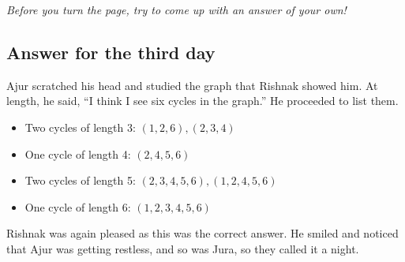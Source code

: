 \textit{Before you turn the page, try to come up with an answer of your own!}

\newpage
\subsection*{Answer for the third day}
Ajur scratched his head and studied the graph that Rishnak showed him.  At length, he said, ``I think I see six cycles in the graph.'' He proceeded to list them.
\begin{itemize}
    \item Two cycles of length 3: $(1,2,6), (2,3,4)$
    \item One cycle of length 4: $(2,4,5,6)$
    \item Two cycles of length 5: $(2,3,4,5,6), (1,2,4,5,6)$
    \item One cycle of length 6: $(1,2,3,4,5,6)$
\end{itemize}

Rishnak was again pleased as this was the correct answer. He smiled and noticed that Ajur was getting restless, and so was Jura, so they called it a night.